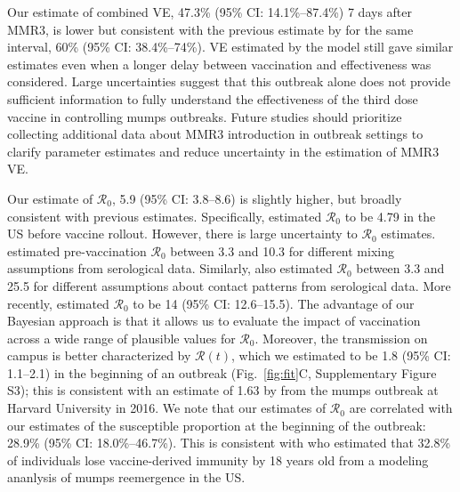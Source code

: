 \documentclass[12pt]{article}
\newcommand{\fref}[1]{Fig.~\ref{fig:#1}}
\begin{document}
Our estimate of combined VE, 47.3\% (95\% CI: 14.1\%--87.4\%) 7 days after MMR3, is lower but consistent with the previous estimate by \cite{cardemil2017effectiveness} for the same interval, 60\% (95\% CI: 38.4\%--74\%).
VE estimated by the model still gave similar estimates even when a longer delay between vaccination and effectiveness was considered.
Large uncertainties suggest that this outbreak alone does not provide sufficient information to fully understand the effectiveness of the third dose vaccine in controlling mumps outbreaks.
Future studies should prioritize collecting additional data about MMR3 introduction in outbreak settings to clarify parameter estimates and reduce uncertainty in the estimation of MMR3 VE.

Our estimate of $\mathcal R_0$, 5.9 (95\% CI: 3.8--8.6) is slightly higher, but broadly consistent with previous estimates.
Specifically, \cite{lewnard2018vaccine} estimated $\mathcal R_0$ to be 4.79 in the US before vaccine rollout.
However, there is large uncertainty to $\mathcal R_0$ estimates.
\cite{edmunds2000pre} estimated pre-vaccination $\mathcal R_0$ between 3.3 and 10.3 for different mixing assumptions from serological data.
Similarly, \cite{farrington2001estimation} also estimated $\mathcal R_0$ between 3.3 and 25.5 for different assumptions about contact patterns from serological data.
More recently, \cite{gokhale2023disentangling} estimated $\mathcal R_0$ to be 14 (95\% CI: 12.6--15.5).
The advantage of our Bayesian approach is that it allows us to evaluate the impact of vaccination across a wide range of plausible values for $\mathcal R_0$.
Moreover, the transmission on campus is better characterized by $\mathcal R (t)$, which we estimated to be 1.8 (95\% CI: 1.1--2.1) in the beginning of an outbreak (\fref{fit}C, Supplementary Figure S3);
this is consistent with an estimate of 1.63 by \cite{shah2022containing} from the mumps outbreak at Harvard University in 2016.
We note that our estimates of $\mathcal R_0$ are correlated with our estimates of the susceptible proportion at the beginning of the outbreak: 28.9\% (95\% CI: 18.0\%--46.7\%).
This is consistent with \cite{gokhale2023disentangling} who estimated that 32.8\% of individuals lose vaccine-derived immunity by 18 years old from a modeling ananlysis of mumps reemergence in the US.
\end{document}
